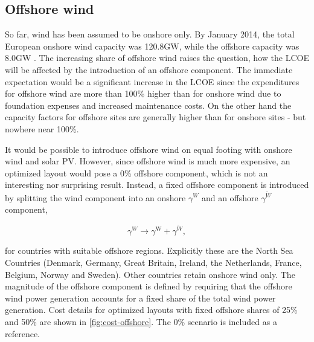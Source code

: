 \documentclass[a4paper, 5p, sort&compress]{elsarticle}%
\begin{document}
{\subsection{Offshore wind}
\label{sec:offshore-wind}

So far, wind has been assumed to be onshore only. By January 2014, the
total European onshore wind capacity was 120.8GW, while the offshore
capacity was 8.0GW \cite{EWEA}. %
The increasing share of offshore wind raises the question, how the
LCOE will be affected by the introduction of an offshore
component. The immediate expectation would be a significant increase
in the LCOE since the expenditures for offshore wind are more than
100\% higher than for onshore wind due to foundation expenses and
increased maintenance costs. On the other hand the capacity factors
for offshore sites are generally higher than for onshore sites - but
nowhere near 100\%.

It would be possible to introduce offshore wind on equal footing with
onshore wind and solar PV. However, since offshore wind is much more
expensive, an optimized layout would pose a 0\% offshore component,
which is not an interesting nor surprising result. Instead, a fixed
offshore component is introduced by splitting the wind component into
an onshore $\gamma^{W}$ and an offshore $\gamma^{\tilde{W}}$ component,

\begin{equation}
  \label{eq:11}
  \gamma^{W} \to \gamma^{\text{W}} + \gamma^{\text{$\tilde{W}$}}, 
\end{equation}

for countries with suitable offshore regions. Explicitly these are the
North Sea Countries (Denmark, Germany, Great Britain, Ireland, the
Netherlands, France, Belgium, Norway and Sweden). Other countries
retain onshore wind only. The magnitude of the offshore component is
defined by requiring that the offshore wind power generation accounts
for a fixed share of the total wind power generation. %
%
%
Cost details for optimized layouts with fixed offshore shares of 25\%
and 50\% are shown in \cref{fig:cost-offshore}. The 0\% scenario is
included as a reference.

}
\end{document}
